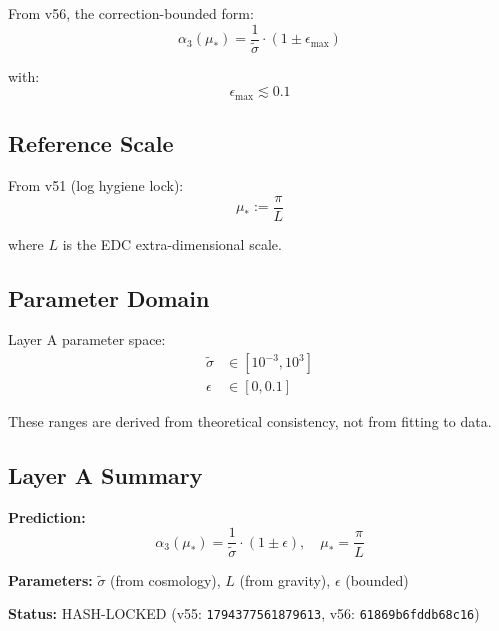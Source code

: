 \documentclass[11pt,a4paper]{article}
\theoremstyle{definition}
\begin{document}
From v56, the correction-bounded form:
\begin{equation}
\label{eq:alpha3-bounded}
\boxed{\alpha_3(\mu_*) = \frac{1}{\tilde{\sigma}} \cdot (1 \pm \epsilon_{\max})}
\end{equation}

with:
\begin{equation}
\label{eq:epsilon-bound}
\epsilon_{\max} \lesssim 0.1
\end{equation}

\subsection{Reference Scale}
\label{subsec:reference-scale}

From v51 (log hygiene lock):
\begin{equation}
\label{eq:mustar-def}
\boxed{\mu_* := \frac{\pi}{L}}
\end{equation}

where $L$ is the EDC extra-dimensional scale.

\subsection{Parameter Domain}
\label{subsec:param-domain}

Layer A parameter space:
\begin{align}
\label{eq:sigma-range}
\tilde{\sigma} &\in [10^{-3}, 10^{3}] \\
\label{eq:epsilon-range}
\epsilon &\in [0, 0.1]
\end{align}

These ranges are derived from theoretical consistency, not from fitting to data.

\subsection{Layer A Summary}
\label{subsec:layer-a-summary}

\begin{canonbox}
\textbf{Prediction:}
\begin{equation}
\label{eq:layer-a-final}
\alpha_3(\mu_*) = \frac{1}{\tilde{\sigma}} \cdot (1 \pm \epsilon), \quad
  \mu_* = \frac{\pi}{L}
\end{equation}

\textbf{Parameters:} $\tilde{\sigma}$ (from cosmology), $L$ (from gravity), $\epsilon$ (bounded)

\textbf{Status:} HASH-LOCKED (v55: \texttt{1794377561879613}, v56: \texttt{61869b6fddb68c16})
\end{canonbox}
\end{document}

